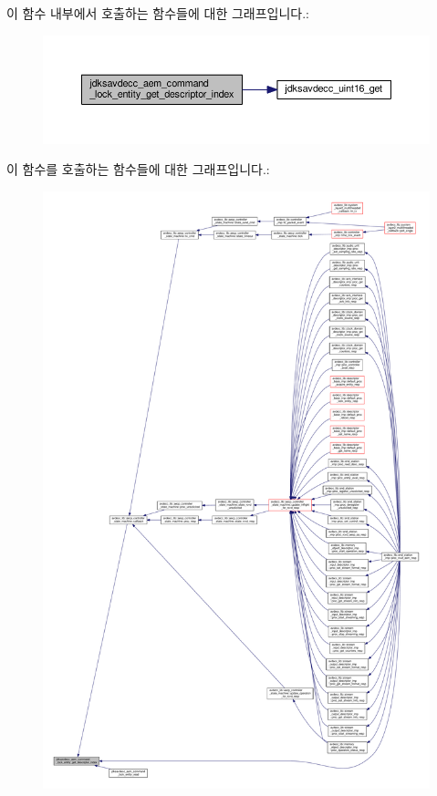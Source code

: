 이 함수 내부에서 호출하는 함수들에 대한 그래프입니다.\+:
\nopagebreak
\begin{figure}[H]
\begin{center}
\leavevmode
\includegraphics[width=350pt]{group__command__lock__entity_gabfe9a5d0582adea94a9b28e47c7e2358_cgraph}
\end{center}
\end{figure}




이 함수를 호출하는 함수들에 대한 그래프입니다.\+:
\nopagebreak
\begin{figure}[H]
\begin{center}
\leavevmode
\includegraphics[width=350pt]{group__command__lock__entity_gabfe9a5d0582adea94a9b28e47c7e2358_icgraph}
\end{center}
\end{figure}


